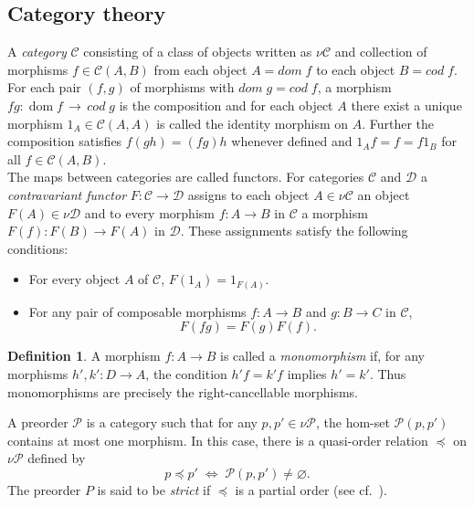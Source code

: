 \documentclass[12pt,a4paper]{amsart}
\theoremstyle{plain}
\theoremstyle{definition}
\newtheorem{definition}[theorem]{Definition}
\DeclareMathOperator{\dom}{dom}
\begin{document}
\subsection{Category theory}	
	A \textit{category} $ \mathcal C $ consisting of a class of  objects  written as $\nu {\mathcal C}$  and collection of morphisms $ f \in \mathcal C(A,B)$ from each object $ A = dom\; f $  to each object $ B = cod\; f $. For each pair $ (f,g) $ of morphisms with $ dom\; g=cod\; f $, a morphism $fg : \dom f \, \rightarrow\,cod\; g$ is the composition  and for each object $ A $ there exist a  unique morphism   $  1_A \in \mathcal C( A,A ) $ is  called the identity morphism on $A$. Further the composition satisfies $ f(gh) = (fg)h $ whenever defined and $  1_A f = f = f 1_B  $ for all $f \in  \mathcal C ( A,B) $.\\
The maps between categories are called functors. For categories $\mathcal{C}$ and $ \mathcal{D}  $
	a \emph{contravariant functor} $F : \mathcal{C} \to \mathcal{D}$ assigns to each object 
$A \in \nu\mathcal{C}$ an object $F(A) \in \nu\mathcal{D}$ and to every morphism 
$f : A \to B$ in $\mathcal{C}$ a morphism
$F(f) : F(B) \to F(A)$
in $\mathcal{D}$.
These assignments satisfy the following conditions:
\begin{itemize}
	\item For every object $A$ of $\mathcal{C}$,
	$	F(1_A) = 1_{F(A)}.$
	
	\item For any pair of composable morphisms $f : A \to B$ and $g : B \to C$ in $\mathcal{C}$,
	\[
	F(fg) = F(g) F(f) .
	\]
\end{itemize}
\begin{definition}
	A morphism \(f : A \to B\) is called a \emph{monomorphism} if, for any
	morphisms \(h',k' : D \to A\), the condition \(h'f = k'f\) implies \(h' = k'\).
	Thus monomorphisms are precisely the right-cancellable morphisms.
\end{definition}
A preorder $\mathcal {P}$ is a category such that for any $p, p' \in \nu \mathcal {P}$, the
hom-set $\mathcal {P}(p,p')$ contains at most one morphism. In this case, there is a
quasi-order relation $\preceq$ on $\nu \mathcal {P}$ defined by
\[
p \preceq p' \;\Longleftrightarrow\; \mathcal {P}(p,p') \neq \varnothing.
\]
The preorder $P$ is said to be \emph{strict} if $\preceq$ is a partial order (see cf.~\cite{kss}).
\end{document}
